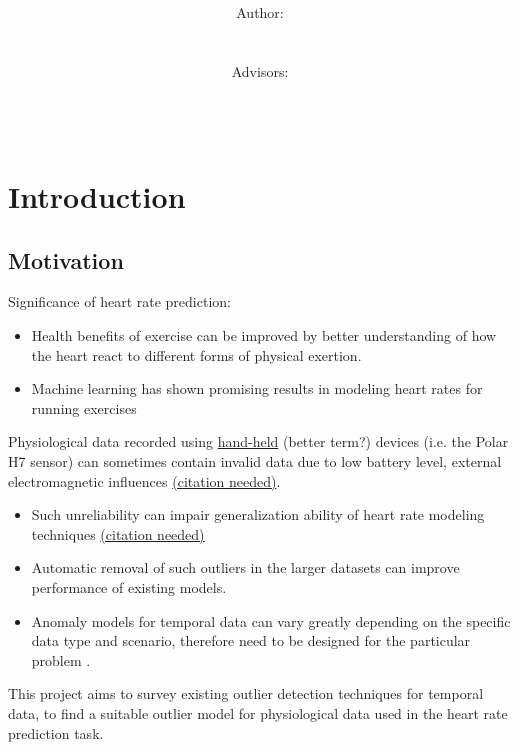 \documentclass[12pt]{article}
\title{\normalsize \textsc{\hmwkAuthorSchool}   %
    \\[2.0cm]                                   %
    \HRule{0.5pt} \\                            %
    \LARGE \textbf{\uppercase{\hmwkTopic}}
    \HRule{2pt} \\ [0.5cm]                      %
    \hmwkTitle\\[0.5cm]
    \normalsize \hmwkDueDate\\
}
\author{
    \\[4.0cm]
    Author:\\
    \hmwkAuthorName\\
    \ \\
    Advisors:\\
    \hmwkAdvisorFirst\\
    \hmwkAdvisorSecond\\
}
\date{}
\begin{document}
    \maketitle
    \thispagestyle{firststyle}
    \newpage

\section{Introduction}

    \subsection{Motivation}

    Significance of heart rate prediction:
    \begin{itemize}
        \item Health benefits of exercise can be improved by better understanding of how the heart react to different forms of physical exertion.
        \item Machine learning has shown promising results in modeling heart rates for running exercises \cite{Fueller15}
    \end{itemize}

    Physiological data recorded using \underline{hand-held} (better term?) devices (i.e. the Polar H7 sensor) can sometimes contain invalid data due to low battery level, external electromagnetic influences \underline{(citation needed)}.
    \begin{itemize}
        \item Such unreliability can impair generalization ability of heart rate modeling techniques \underline{(citation needed)}
        \item Automatic removal of such outliers in the larger datasets can improve performance of existing models.
        \item Anomaly models for temporal data can vary greatly depending on the specific data type and scenario, therefore need to be designed for the particular problem \cite{Gupta2013}.
    \end{itemize}

    This project aims to survey existing outlier detection techniques for temporal data, to find a suitable outlier model for physiological data used in the heart rate prediction task.

\end{document}
